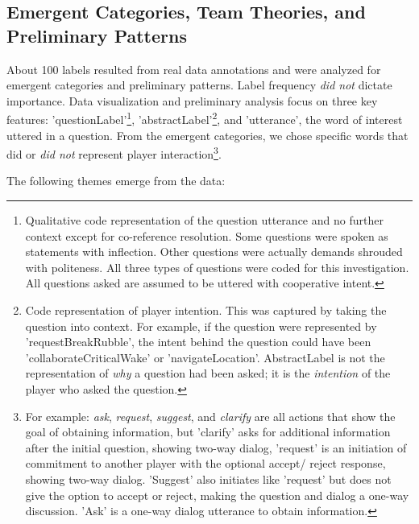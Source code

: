 \subsection{Emergent Categories, Team Theories, and Preliminary Patterns}

About 100 labels resulted from real data annotations and were analyzed for
emergent categories and preliminary patterns. Label frequency \emph{did not}
dictate importance. Data visualization and preliminary analysis focus on three
key features: 'questionLabel'\footnote{Qualitative code representation of the
question utterance and no further context except for co-reference resolution.
Some questions were spoken as statements with inflection. Other questions were
actually demands shrouded with politeness. All three types of questions were
coded for this investigation. All questions asked are assumed to be uttered
with cooperative intent.}, 'abstractLabel'\footnote{Code representation of
player intention. This was captured by taking the question into context. For
example, if the question were represented by 'requestBreakRubble', the intent
behind the question could have been 'collaborateCriticalWake' or
'navigateLocation'. AbstractLabel is not the representation of \emph{why} a
question had been asked; it is the \emph{intention} of the player who asked the
question.}, and 'utterance', the word of interest uttered in a question. From
the emergent categories, we chose specific words that did or \emph{did not}
represent player interaction\footnote{For example: \emph{ask}, \emph{request},
\emph{suggest}, and \emph{clarify} are all actions that show the goal of
obtaining information, but 'clarify' asks for additional information after the
initial question, showing two-way dialog, 'request' is an initiation of
commitment to another player with the optional accept/ reject response, showing
two-way dialog. 'Suggest' also initiates like 'request' but does not give the
option to accept or reject, making the question and dialog a one-way
discussion. 'Ask' is a one-way dialog utterance to obtain information.}. 

The following themes emerge from the data:

